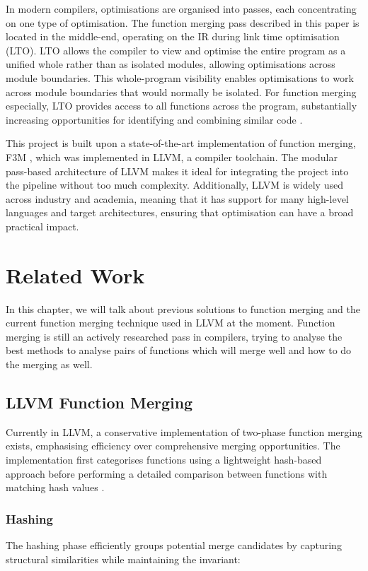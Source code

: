 In modern compilers, optimisations are organised into passes, each concentrating on one type of optimisation. The function merging pass described in this paper is located in the middle-end, operating on the IR during link time optimisation (LTO). LTO allows the compiler to view and optimise the entire program as a unified whole rather than as isolated modules, allowing optimisations across module boundaries. This whole-program visibility enables optimisations to work across module boundaries that would normally be isolated. For function merging especially, LTO provides access to all functions across the program, substantially increasing opportunities for identifying and combining similar code \cite{FunctionMergingSequenceAlignment}. 

This project is built upon a state-of-the-art implementation of function merging, F3M \cite{F3M:FastFocusedFunctionMerging},  which was implemented in LLVM, a compiler toolchain. The modular pass-based architecture of LLVM makes it ideal for integrating the project into the pipeline without too much complexity. Additionally, LLVM is widely used across industry and academia, meaning that it has support for many high-level languages and target architectures, ensuring that optimisation can have a broad practical impact.

\section{Related Work}
In this chapter, we will talk about previous solutions to function merging and the current function merging technique used in LLVM at the moment. Function merging is still an actively researched pass in compilers, trying to analyse the best methods to analyse pairs of functions which will merge well and how to do the merging as well.

\subsection{LLVM Function Merging}
Currently in LLVM, a conservative implementation of two-phase function merging exists, emphasising efficiency over comprehensive merging opportunities. The implementation first categorises functions using a lightweight hash-based approach before performing a detailed comparison between functions with matching hash values \cite{LLVMFuncMergSrc}.

\subsubsection{Hashing}
The hashing phase efficiently groups potential merge candidates by capturing structural similarities while maintaining the invariant:


